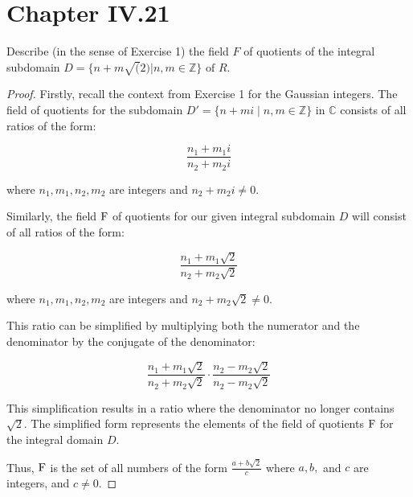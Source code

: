 \documentclass[12pt]{amsart}
\theoremstyle{definition}
\numberwithin{equation}{section}
\theoremstyle{plain}
\newcommand{\Z}{\mathbb{Z}}
\renewcommand{\C}{\mathbb{C}}
\begin{document}
\section*{Chapter IV.21}
\begin{exercise}{2} Describe (in the sense of Exercise 1) the field $F$ of quotients of the integral subdomain $D =\{n +m
    \sqrt(2) | n,m \in \Z\} \text{ of } R$.
   
\begin{proof}
Firstly, recall the context from Exercise 1 for the Gaussian integers. The field of quotients for the subdomain \( D' = \{ n + mi \mid n, m \in \Z \} \) in \( \C \) consists of all ratios of the form:

\[
\frac{n_1 + m_1i}{n_2 + m_2i}
\]

where \( n_1, m_1, n_2, m_2 \) are integers and \( n_2 + m_2i \neq 0 \).

Similarly, the field \( $F$ \) of quotients for our given integral subdomain \( D \) will consist of all ratios of the form:

\[
\frac{n_1 + m_1 \sqrt{2}}{n_2 + m_2 \sqrt{2}}
\]

where \( n_1, m_1, n_2, m_2 \) are integers and \( n_2 + m_2 \sqrt{2} \neq 0 \). 

This ratio can be simplified by multiplying both the numerator and the denominator by the conjugate of the denominator:

\[
\frac{n_1 + m_1 \sqrt{2}}{n_2 + m_2 \sqrt{2}} \cdot \frac{n_2 - m_2 \sqrt{2}}{n_2 - m_2 \sqrt{2}}
\]

This simplification results in a ratio where the denominator no longer contains \( \sqrt{2} \). The simplified form represents the elements of the field of quotients \( $F$ \) for the integral domain \( D \).

Thus, \( $F$ \) is the set of all numbers of the form \( \frac{a + b \sqrt{2}}{c} \) where \( a, b, \) and \( c \) are integers, and \( c \neq 0 \).
\end{proof}
\end{exercise}
\vspace*{20pt}
\end{document}

